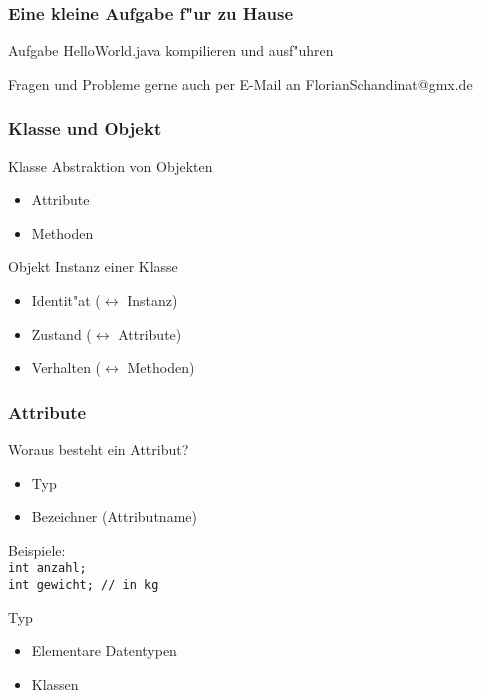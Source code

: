 \documentclass{beamer}
\begin{document}
\begin{frame}
\frametitle{Eine kleine Aufgabe f"ur zu Hause}
\begin{block}{Aufgabe}
HelloWorld.java kompilieren und ausf"uhren
\end{block}

\begin{block}{Fragen und Probleme}
gerne auch per E-Mail an FlorianSchandinat@gmx.de
\end{block}
\end{frame}


\begin{frame}
\frametitle{Klasse und Objekt}
\pause
\begin{block}{Klasse}
Abstraktion von Objekten\\
\pause
\begin{itemize}
\item Attribute
\item Methoden
\end{itemize}
\end{block}

\pause

\begin{block}{Objekt}
Instanz einer Klasse\\
\pause
\begin{itemize}
\item Identit"at ($\leftrightarrow$ Instanz)
\item Zustand ($\leftrightarrow$ Attribute)
\item Verhalten ($\leftrightarrow$ Methoden)
\end{itemize}
\end{block}
\end{frame}


\begin{frame}
\frametitle{Attribute}
\begin{block}{Woraus besteht ein Attribut?}
\pause
\begin{itemize}
\item Typ
\item Bezeichner (Attributname)
\end{itemize}
\pause
Beispiele:\\
\lstinline|int anzahl;|\\
\lstinline|int gewicht; // in kg|
\end{block}

\pause

\begin{block}{Typ}
\begin{itemize}
\item Elementare Datentypen
\item Klassen
\end{itemize}
\end{block}
\end{frame}
\end{document}
